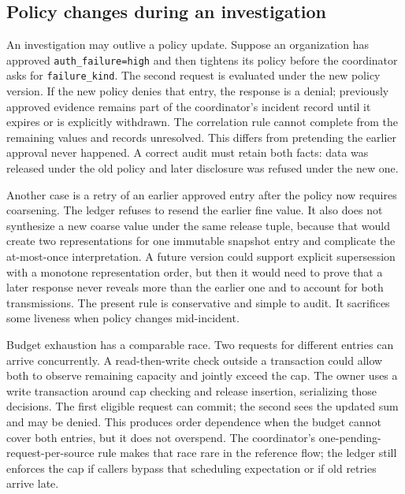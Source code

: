\documentclass[conference,letterpaper]{IEEEtran}
\begin{document}
\subsection{Policy changes during an investigation}
An investigation may outlive a policy update. Suppose an organization has approved \texttt{auth\_failure=high} and then tightens its policy before the coordinator asks for \texttt{failure\_kind}. The second request is evaluated under the new policy version. If the new policy denies that entry, the response is a denial; previously approved evidence remains part of the coordinator's incident record until it expires or is explicitly withdrawn. The correlation rule cannot complete from the remaining values and records unresolved. This differs from pretending the earlier approval never happened. A correct audit must retain both facts: data was released under the old policy and later disclosure was refused under the new one.

Another case is a retry of an earlier approved entry after the policy now requires coarsening. The ledger refuses to resend the earlier fine value. It also does not synthesize a new coarse value under the same release tuple, because that would create two representations for one immutable snapshot entry and complicate the at-most-once interpretation. A future version could support explicit supersession with a monotone representation order, but then it would need to prove that a later response never reveals more than the earlier one and to account for both transmissions. The present rule is conservative and simple to audit. It sacrifices some liveness when policy changes mid-incident.

Budget exhaustion has a comparable race. Two requests for different entries can arrive concurrently. A read-then-write check outside a transaction could allow both to observe remaining capacity and jointly exceed the cap. The owner uses a write transaction around cap checking and release insertion, serializing those decisions. The first eligible request can commit; the second sees the updated sum and may be denied. This produces order dependence when the budget cannot cover both entries, but it does not overspend. The coordinator's one-pending-request-per-source rule makes that race rare in the reference flow; the ledger still enforces the cap if callers bypass that scheduling expectation or if old retries arrive late.
\end{document}

